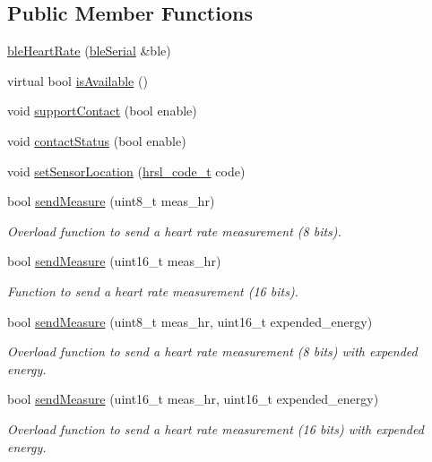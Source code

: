 \subsection*{Public Member Functions}
\begin{DoxyCompactItemize}
\item 
\hyperlink{classble_heart_rate_af5e0bc81b5d2f8e290b6cba8050f80c2}{ble\-Heart\-Rate} (\hyperlink{classble_serial}{ble\-Serial} \&ble)
\item 
virtual bool \hyperlink{classble_heart_rate_a822019806bf50f6d25ae075b62a838ab}{is\-Available} ()
\item 
void \hyperlink{classble_heart_rate_acd5a0148a2df6692893a274a18710431}{support\-Contact} (bool enable)
\item 
void \hyperlink{classble_heart_rate_a4b05ceb33ffe7fcfe9f1a3dbf9679882}{contact\-Status} (bool enable)
\item 
void \hyperlink{classble_heart_rate_a9c822ea4fafcb609e009427feb0949c2}{set\-Sensor\-Location} (\hyperlink{group___b_l_e_ga142ef314a313f7071c544be2939c13a3}{hrsl\-\_\-code\-\_\-t} code)
\item 
bool \hyperlink{classble_heart_rate_a2b7329b1756f03c99334b6575e14c090}{send\-Measure} (uint8\-\_\-t meas\-\_\-hr)
\begin{DoxyCompactList}\small\item\em Overload function to send a heart rate measurement (8 bits). \end{DoxyCompactList}\item 
bool \hyperlink{classble_heart_rate_a9f69ad22553dabc5b992bf9a15aa6667}{send\-Measure} (uint16\-\_\-t meas\-\_\-hr)
\begin{DoxyCompactList}\small\item\em Function to send a heart rate measurement (16 bits). \end{DoxyCompactList}\item 
bool \hyperlink{classble_heart_rate_ac0bd83937f2997c2451918a421c277c2}{send\-Measure} (uint8\-\_\-t meas\-\_\-hr, uint16\-\_\-t expended\-\_\-energy)
\begin{DoxyCompactList}\small\item\em Overload function to send a heart rate measurement (8 bits) with expended energy. \end{DoxyCompactList}\item 
bool \hyperlink{classble_heart_rate_a34a055d4b926b2447ca78a4f63691d30}{send\-Measure} (uint16\-\_\-t meas\-\_\-hr, uint16\-\_\-t expended\-\_\-energy)
\begin{DoxyCompactList}\small\item\em Overload function to send a heart rate measurement (16 bits) with expended energy. \end{DoxyCompactList}\item 

\end{DoxyCompactItemize}

